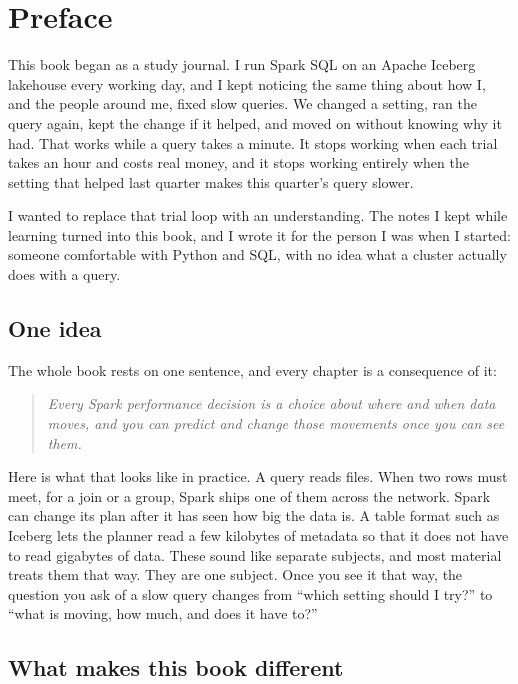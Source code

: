\chapter{Preface}
\label{ch:preface}

This book began as a study journal. I run Spark SQL on an Apache Iceberg
lakehouse every working day, and I kept noticing the same thing about how I, and
the people around me, fixed slow queries. We changed a setting, ran the query
again, kept the change if it helped, and moved on without knowing why it had. That
works while a query takes a minute. It stops working when each trial takes an hour
and costs real money, and it stops working entirely when the setting that helped
last quarter makes this quarter's query slower.

I wanted to replace that trial loop with an understanding. The notes I kept while
learning turned into this book, and I wrote it for the person I was when I
started: someone comfortable with Python and SQL, with no idea what a cluster
actually does with a query.

\section*{One idea}

The whole book rests on one sentence, and every chapter is a consequence of it:

\begin{quote}
\itshape
Every Spark performance decision is a choice about where and when data moves,
and you can predict and change those movements once you can see them.
\end{quote}

Here is what that looks like in practice. A query reads files. When two rows must
meet, for a join or a group, Spark ships one of them across the network. Spark can
change its plan after it has seen how big the data is. A table format such
as Iceberg lets the planner read a few kilobytes of metadata so that it does not
have to read gigabytes of data. These sound like separate subjects, and most
material treats them that way. They are one subject. Once you see it that way, the
question you ask of a slow query changes from ``which setting should I try?'' to
``what is moving, how much, and does it have to?''

\section*{What makes this book different}

